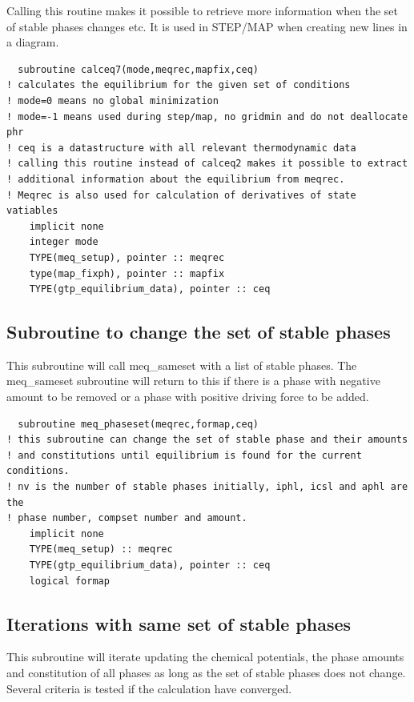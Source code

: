 \documentclass[12pt]{article}
\begin{document}
Calling this routine makes it possible to retrieve more information
when the set of stable phases changes etc.  It is used in STEP/MAP
when creating new lines in a diagram.

{\small
\begin{verbatim}
  subroutine calceq7(mode,meqrec,mapfix,ceq)
! calculates the equilibrium for the given set of conditions
! mode=0 means no global minimization
! mode=-1 means used during step/map, no gridmin and do not deallocate phr
! ceq is a datastructure with all relevant thermodynamic data
! calling this routine instead of calceq2 makes it possible to extract
! additional information about the equilibrium from meqrec.
! Meqrec is also used for calculation of derivatives of state vatiables
    implicit none
    integer mode
    TYPE(meq_setup), pointer :: meqrec
    type(map_fixph), pointer :: mapfix
    TYPE(gtp_equilibrium_data), pointer :: ceq
\end{verbatim}
}

\subsection{Subroutine to change the set of stable phases}

This subroutine will call meq\_sameset with a list of stable phases.
The meq\_sameset subroutine will return to this if there is a phase
with negative amount to be removed or a phase with positive driving
force to be added.

{\small
\begin{verbatim}
  subroutine meq_phaseset(meqrec,formap,ceq)
! this subroutine can change the set of stable phase and their amounts
! and constitutions until equilibrium is found for the current conditions.
! nv is the number of stable phases initially, iphl, icsl and aphl are the
! phase number, compset number and amount.
    implicit none
    TYPE(meq_setup) :: meqrec
    TYPE(gtp_equilibrium_data), pointer :: ceq
    logical formap
\end{verbatim}
}

\subsection{Iterations with same set of stable phases}

This subroutine will iterate updating the chemical potentials, the
phase amounts and constitution of all phases as long as the set of
stable phases does not change.  Several criteria is tested if the
calculation have converged.
\end{document}
